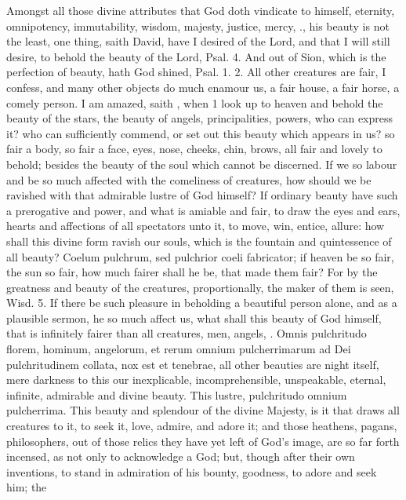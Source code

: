{Amongst all those divine attributes that God doth vindicate to himself,
eternity, omnipotency, immutability, wisdom, majesty, justice, mercy,
\etc{}., his beauty is not the least, one thing, saith David, have I
desired of the Lord, and that I will still desire, to behold the beauty
of the Lord, Psal.  4. And out of Sion, which is the perfection
of beauty, hath God shined, Psal. 1. 2. All other creatures are fair, I
confess, and many other objects do much enamour us, a fair house, a
fair horse, a comely person. I am amazed, saith \Austin{}, when 1
look up to heaven and behold the beauty of the stars, the beauty of
angels, principalities, powers, who can express it? who can
sufficiently commend, or set out this beauty which appears in us? so
fair a body, so fair a face, eyes, nose, cheeks, chin, brows, all fair
and lovely to behold; besides the beauty of the soul which cannot be
discerned. If we so labour and be so much affected with the comeliness
of creatures, how should we be ravished with that admirable lustre of
God himself? If ordinary beauty have such a prerogative and power, and
what is amiable and fair, to draw the eyes and ears, hearts and
affections of all spectators unto it, to move, win, entice, allure: how
shall this divine form ravish our souls, which is the fountain and
quintessence of all beauty? Coelum pulchrum, sed pulchrior coeli
fabricator; if heaven be so fair, the sun so fair, how much fairer
shall he be, that made them fair? For by the greatness and beauty of
the creatures, proportionally, the maker of them is seen, Wisd. 
5. If there be such pleasure in beholding a beautiful person alone, and
as a plausible sermon, he so much affect us, what shall this beauty of
God himself, that is infinitely fairer than all creatures, men, angels,
\etc{}.  Omnis pulchritudo florem, hominum, angelorum, et rerum
omnium pulcherrimarum ad Dei pulchritudinem collata, nox est et
tenebrae, all other beauties are night itself, mere darkness to this
our inexplicable, incomprehensible, unspeakable, eternal, infinite,
admirable and divine beauty. This lustre, pulchritudo omnium
pulcherrima. This beauty and  splendour of the divine Majesty, is
it that draws all creatures to it, to seek it, love, admire, and adore
it; and those heathens, pagans, philosophers, out of those relics they
have yet left of God's image, are so far forth incensed, as not only to
acknowledge a God; but, though after their own inventions, to stand in
admiration of his bounty, goodness, to adore and seek him; the
}
